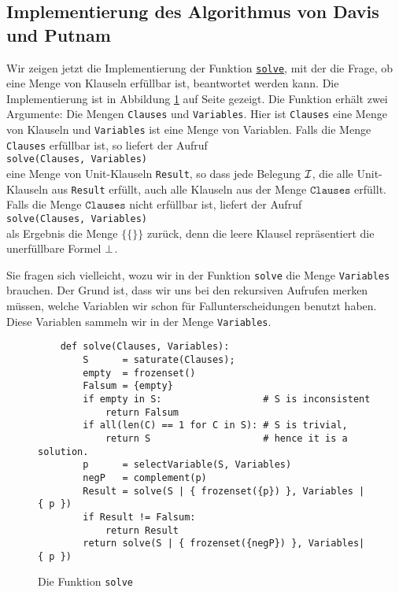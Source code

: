 \subsection{Implementierung des Algorithmus von Davis und Putnam}
Wir zeigen jetzt die Implementierung der Funktion 
\href{https://github.com/karlstroetmann/Logic/blob/master/SetlX/davis-putnam.stlx}{\texttt{solve}}, 
mit der die Frage, ob eine Menge von Klauseln erfüllbar ist, beantwortet werden kann. Die
Implementierung ist in Abbildung \ref{fig:solve} auf Seite \pageref{fig:solve}
gezeigt.  Die Funktion erhält zwei Argumente: Die Mengen \texttt{Clauses} und \texttt{Variables}.
Hier ist \texttt{Clauses} eine Menge von Klauseln und \texttt{Variables} ist eine Menge von
Variablen.  Falls die Menge \texttt{Clauses} erfüllbar ist, so liefert
der Aufruf 
\\[0.2cm]
\hspace*{1.3cm}
\texttt{solve(Clauses, Variables)} 
\\[0.2cm]
eine Menge von Unit-Klauseln \texttt{Result}, so
dass jede Belegung $\mathcal{I}$, die alle Unit-Klauseln aus \texttt{Result} erfüllt, auch alle Klauseln aus
der Menge  $\texttt{Clauses}$ erfüllt.  Falls die Menge $\texttt{Clauses}$ nicht erfüllbar ist, liefert der Aufruf
\\[0.2cm]
\hspace*{1.3cm}
\texttt{solve(Clauses, Variables)} 
\\[0.2cm]
als Ergebnis die Menge $\bigl\{ \{\} \bigr\}$ zurück, denn die leere Klausel repräsentiert die unerfüllbare Formel $\bot$.

Sie fragen sich vielleicht, wozu wir in der Funktion \texttt{solve} die Menge
\texttt{Variables} brauchen.  Der Grund ist, dass wir uns bei den rekursiven Aufrufen
merken müssen, welche Variablen wir schon für Fallunterscheidungen benutzt haben.  Diese Variablen sammeln wir in der
Menge \texttt{Variables}.


\begin{figure}[!ht]
  \centering
\begin{verbatim}
    def solve(Clauses, Variables):
        S      = saturate(Clauses);
        empty  = frozenset()
        Falsum = {empty}
        if empty in S:                  # S is inconsistent
            return Falsum               
        if all(len(C) == 1 for C in S): # S is trivial,
            return S                    # hence it is a solution.
        p      = selectVariable(S, Variables)
        negP   = complement(p)
        Result = solve(S | { frozenset({p}) }, Variables | { p })
        if Result != Falsum:
            return Result
        return solve(S | { frozenset({negP}) }, Variables| { p })
\end{verbatim}
\vspace*{-0.3cm}
  \caption{Die Funktion \texttt{solve}}
  \label{fig:solve}
\end{figure} 

